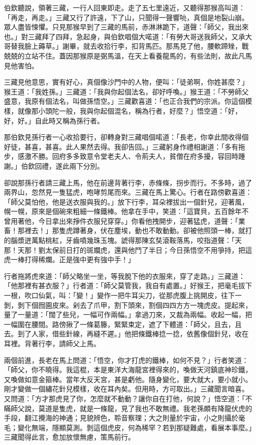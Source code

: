 伯欽聽說，領著三藏，一行人回東即走。走了五七里遠近，又聽得那猴高叫道：「再走，再走。」三藏又行了許遠，下了山，只聞得一聲響喨，真個是地裂山崩。眾人盡皆悚懼。只見那猴早到了三藏的馬前，赤淋淋跪下，道聲：「師父，我出來也。」對三藏拜了四拜，急起身，與伯欽唱個大喏道：「有勞大哥送我師父，又承大哥替我臉上薅草。」謝畢，就去收拾行李，扣背馬匹。那馬見了他，腰軟蹄矬，戰兢兢的立站不住。蓋因那猴原是弼馬溫，在天上看養龍馬的，有些法則，故此凡馬見他害怕。

三藏見他意思，實有好心，真個像沙門中的人物，便叫：「徒弟啊，你姓甚麼？」猴王道：「我姓孫。」三藏道：「我與你起個法名，卻好呼喚。」猴王道：「不勞師父盛意，我原有個法名，叫做孫悟空。」三藏歡喜道：「也正合我們的宗派。你這個模樣，就像那小頭陀一般，我與你起個混名，稱為行者，好麼？」悟空道：「好，好，好。」自此時又稱為孫行者。

那伯欽見孫行者一心收拾要行，卻轉身對三藏唱個喏道：「長老，你幸此間收得個好徒，甚喜，甚喜。此人果然去得。我卻告回。」三藏躬身作禮相謝道：「多有拖步，感激不勝。回府多多致意令堂老夫人、令荊夫人，貧僧在府多擾，容回時踵謝。」伯欽回禮，遂此兩下分別。

卻說那孫行者請三藏上馬，他在前邊背著行李，赤條條，拐步而行。不多時，過了兩界山，忽然見一隻猛虎，咆哮剪尾而來。三藏在馬上驚心。行者在路傍歡喜道：「師父莫怕他，他是送衣服與我的。」放下行李，耳朵裡拔出一個針兒，迎著風，幌一幌，原來是個碗來粗細一條鐵棒。他拿在手中，笑道：「這寶貝，五百餘年不曾用著他，今日拿出來掙件衣服兒穿穿。」你看他拽開步，迎著猛虎，道聲：「業畜！那裡去！」那隻虎蹲著身，伏在塵埃，動也不敢動動。卻被他照頭一棒，就打的腦漿迸萬點桃紅，牙齒噴幾珠玉塊。諕得那陳玄奘滾鞍落馬，咬指道聲：「天那！天那！劉太保前日打的斑斕虎，還與他鬥了半日；今日孫悟空不用爭持，把這虎一棒打得稀爛。正是強中更有強中手！」

行者拖將虎來道：「師父略坐一坐，等我脫下他的衣服來，穿了走路。」三藏道：「他那裡有甚衣服？」行者道：「師父莫管我，我自有處置。」好猴王，把毫毛拔下一根，吹口仙氣，叫：「變！」變作一把牛耳尖刀，從那虎腹上挑開皮，往下一剝，剝下個囫圇皮來。剁去了爪甲，割下頭來，割個四四方方一塊虎皮。提起來，量了一量道：「闊了些兒，一幅可作兩幅。」拿過刀來，又裁為兩幅。收起一幅，把一幅圍在腰間。路傍揪了一條葛籐，緊緊束定，遮了下體道：「師父，且去，且去。到了人家，借些針線，再縫不遲。」他把條鐵棒捻一捻，依舊像個針兒，收在耳裡。背著行李，請師父上馬。

兩個前進，長老在馬上問道：「悟空，你才打虎的鐵棒，如何不見？」行者笑道：「師父，你不曉得。我這棍，本是東洋大海龍宮裡得來的，喚做天河鎮底神珍鐵，又喚做如意金箍棒。當年大反天宮，甚是虧他。隨身變化，要大就大，要小就小。剛才變做一個繡花針兒模樣，收在耳內矣。但用時，方可取出。」三藏聞言暗喜。又問道：「方才那虎見了你，怎麼就不動動？讓你自在打他，何說？」悟空道：「不瞞師父說，莫道是隻虎，就是一條龍，見了我也不敢無禮。我老孫頗有降龍伏虎的手段，翻江攪海的神通；見貌辨色，聆音察理；大之則量於宇宙，小之則攝於毫毛；變化無端，隱顯莫測。剝這個虎皮，何為稀罕？若到那疑難處，看展本事麼。」三藏聞得此言，愈加放懷無慮，策馬前行。

